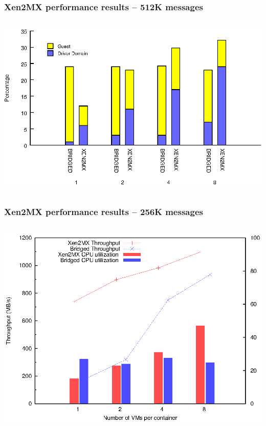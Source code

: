 \documentclass[red,slidestop,notes,compress,mathserif]{beamer}
\begin{document}
\begin{frame}
\frametitle{Xen2MX performance results -- 512K messages}
\begin{columns}
\includegraphics[width=\textwidth]{figs/bare/aggregate_doms_cpu.eps}
\end{columns}
\end{frame}

\begin{frame}
\frametitle{Xen2MX performance results -- 256K messages}
\begin{columns}
\includegraphics[width=\textwidth]{figs/bare/cpu_util.eps}
\end{columns}
\end{frame}
\end{document}
